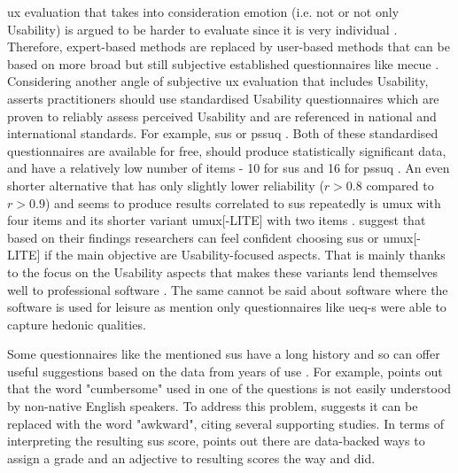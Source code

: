 \gls{ux} evaluation that takes into consideration emotion (i.e. not or not only Usability) is argued to be harder to evaluate since it is very individual \parencite{Juergen_et_all_2020}.
Therefore, expert-based methods are replaced by user-based methods that can be based on more broad but still subjective established questionnaires like \gls{mecue} \parencite{Juergen_et_all_2020}.
Considering another angle of subjective \gls{ux} evaluation that includes Usability, \textcite{Lewis_2014} asserts practitioners should use standardised Usability questionnaires which are proven to reliably assess perceived Usability and are referenced in national and international standards.
For example, \gls{sus} \parencite{Lewis_2018} or \gls{pssuq} \parencite{Lewis_1995, Lewis_2002}.
Both of these standardised questionnaires are available for free, should produce statistically significant data, and have a relatively low number of items - 10 for \gls{sus} and 16 for \gls{pssuq} \parencite{Lewis_2014}.
An even shorter alternative that has only slightly lower reliability ($r>0.8$ compared to $r>0.9$) and seems to produce results correlated to \gls{sus} repeatedly is \gls{umux} with four items and its shorter variant \gls{umux}[-LITE] with two items \parencite{Lewis_2014,Lewis_2018}.
\textcite{Schrepp_Kollmorge_Thomaschewski_2023} suggest that based on their findings researchers can feel confident choosing \gls{sus} or \gls{umux}[-LITE] if the main objective are Usability-focused aspects.
That is mainly thanks to the focus on the Usability aspects that makes these variants lend themselves well to professional software \parencite{Schrepp_Kollmorge_Thomaschewski_2023}.
The same cannot be said about software where the software is used for leisure as \textcite{Schrepp_Kollmorge_Thomaschewski_2023} mention only questionnaires like \gls{ueq-s} were able to capture hedonic qualities.

\label{sec:sus-evaluation}

Some questionnaires like the mentioned \gls{sus} have a long history and so can offer useful suggestions based on the data from years of use \parencite{brooke_2013}.
For example, \textcite[p. 35]{brooke_2013} points out that the word "cumbersome" used in one of the questions is not easily understood by non-native English speakers.
To address this problem, \textcite[p. 35]{brooke_2013} suggests it can be replaced with the word "awkward", citing several supporting studies.
In terms of interpreting the resulting \gls{sus} score, \textcite[pp. 36-37]{brooke_2013} points out there are data-backed ways to assign a grade and an adjective to resulting scores the way \textcite{bangor_determining_2009} and \textcite{sauro_practical_2011} did.

